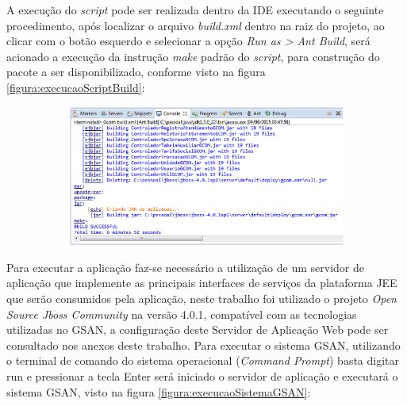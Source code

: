 A execução do \textit{script} pode ser realizada dentro da IDE executando o seguinte procedimento, após localizar o arquivo \textit{build.xml} dentro na raiz do projeto, ao clicar com o botão esquerdo e selecionar a opção \textit{Run as > Ant Build}, será acionado a execução da instrução \textit{make} padrão do \textit{script}, para construção do pacote a ser disponibilizado, conforme visto na figura \ref{figura:execucaoScriptBuild}:	
		

\begin{figure}[H]
	\centering
	\caption{Execução do \textit{script} de build}
	\label{figura:execucaoScriptBuild}
	\begin{subfigure}[H]{\textwidth}
		\centering
	\includegraphics{figuras/build_ant.png}
	\end{subfigure}
\end{figure}		
		

Para executar a aplicação faz-se necessário a utilização de um servidor de aplicação que implemente as principais interfaces de serviços da plataforma JEE que serão consumidos pela aplicação, neste trabalho foi utilizado o projeto \textit{Open Source Jboss Community} na versão 4.0.1, compatível com as tecnologias utilizadas no GSAN, a configuração deste Servidor de Aplicação Web pode ser consultado nos anexos deste trabalho.
Para executar o sistema GSAN, utilizando o terminal de comando do sistema operacional (\textit{Command Prompt}) basta digitar run e pressionar a tecla Enter será iniciado o servidor de aplicação e executará o sistema GSAN, visto na figura \ref{figura:execucaoSistemaGSAN}:


